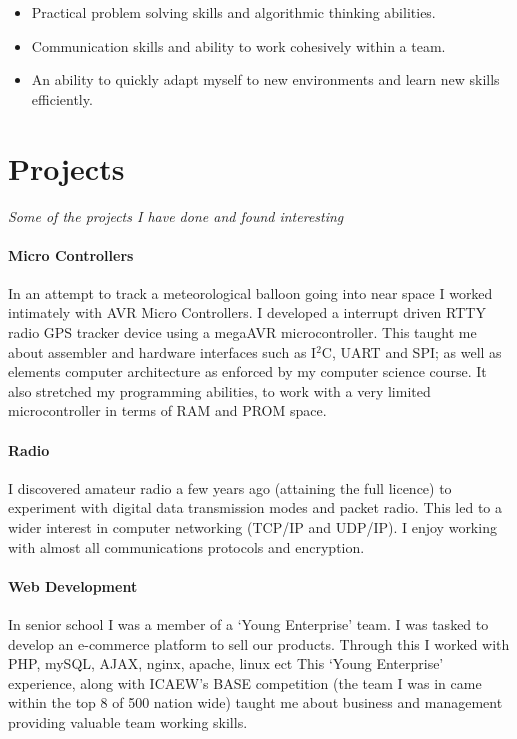 \documentclass[9pt,a4paper]{article}
\begin{document}
\begin{multicols*}{2}
\begin{itemize}
\item Practical problem solving skills and algorithmic thinking abilities.

\item Communication skills and ability to work cohesively within a team.

\item An ability to quickly adapt myself to new environments and learn new skills efficiently.
\end{itemize}

\section*{Projects}
\textit{Some of the projects I have done and found interesting}

\paragraph{Micro Controllers} In an attempt to track a meteorological balloon going into near space I worked intimately with AVR Micro Controllers.
I developed a interrupt driven RTTY radio GPS tracker device using a megaAVR microcontroller.
This taught me about assembler and hardware interfaces such as I$^2$C, UART and SPI;
as well as elements computer architecture as enforced by my computer science course.
It also stretched my programming abilities, to work with a very limited microcontroller in terms of RAM and PROM space.
\vspace*{-0.1cm}
\paragraph{Radio} I discovered amateur radio a few years ago (attaining the full licence) to experiment with digital data transmission modes and packet radio.
This led to a wider interest in computer networking (TCP/IP and UDP/IP).
I enjoy working with almost all communications protocols and encryption.
\vspace*{-0.1cm}
\paragraph{Web Development} In senior school I was a member of a `Young Enterprise' team.
I was tasked to develop an e-commerce platform to sell our products.
Through this I worked with PHP, mySQL, AJAX, nginx, apache, linux ect
This `Young Enterprise' experience, along with ICAEW's BASE competition (the team I was in came within the top 8 of 500 nation wide) taught me about business and management providing valuable team working skills.
\vspace*{-0.1cm}

\end{multicols*}
\end{document}

